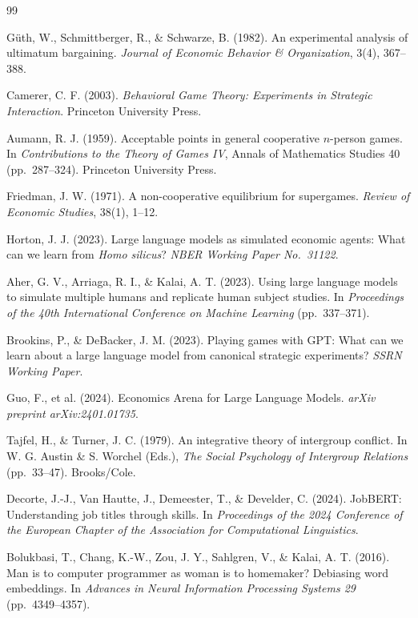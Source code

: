\documentclass[12pt]{article}
\begin{document}
\clearpage
\begin{thebibliography}{99}

G\"{u}th, W., Schmittberger, R., \& Schwarze, B. (1982). An experimental analysis of ultimatum bargaining. \textit{Journal of Economic Behavior \& Organization}, 3(4), 367--388.

Camerer, C. F. (2003). \textit{Behavioral Game Theory: Experiments in Strategic Interaction}. Princeton University Press.

Aumann, R. J. (1959). Acceptable points in general cooperative $n$-person games. In \textit{Contributions to the Theory of Games IV}, Annals of Mathematics Studies 40 (pp.~287--324). Princeton University Press.

Friedman, J. W. (1971). A non-cooperative equilibrium for supergames. \textit{Review of Economic Studies}, 38(1), 1--12.

Horton, J. J. (2023). Large language models as simulated economic agents: What can we learn from \textit{Homo silicus}? \textit{NBER Working Paper No.~31122}.

Aher, G. V., Arriaga, R. I., \& Kalai, A. T. (2023). Using large language models to simulate multiple humans and replicate human subject studies. In \textit{Proceedings of the 40th International Conference on Machine Learning} (pp.~337--371).

Brookins, P., \& DeBacker, J. M. (2023). Playing games with GPT: What can we learn about a large language model from canonical strategic experiments? \textit{SSRN Working Paper}.

Guo, F., et al. (2024). Economics Arena for Large Language Models. \textit{arXiv preprint arXiv:2401.01735}.

Tajfel, H., \& Turner, J. C. (1979). An integrative theory of intergroup conflict. In W. G. Austin \& S. Worchel (Eds.), \textit{The Social Psychology of Intergroup Relations} (pp.~33--47). Brooks/Cole.

Decorte, J.-J., Van Hautte, J., Demeester, T., \& Develder, C. (2024). JobBERT: Understanding job titles through skills. In \textit{Proceedings of the 2024 Conference of the European Chapter of the Association for Computational Linguistics}.

Bolukbasi, T., Chang, K.-W., Zou, J. Y., Sahlgren, V., \& Kalai, A. T. (2016). Man is to computer programmer as woman is to homemaker? Debiasing word embeddings. In \textit{Advances in Neural Information Processing Systems 29} (pp.~4349--4357).


\end{thebibliography}
\end{document}
